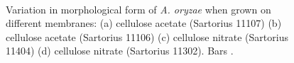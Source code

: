 \begin{figure}[tb]
	\centering
	\hspace{0.5cm}
	\\
	\hspace{0.5cm}
	\caption{Variation in morphological form of \emph{A. oryzae} when grown on different membranes: (a)  cellulose acetate (Sartorius 11107) (b)  cellulose acetate (Sartorius 11106) (c)  cellulose nitrate (Sartorius 11404) (d)  cellulose nitrate (Sartorius 11302). Bars .}
	\label{fig:Membranes}
\end{figure}

